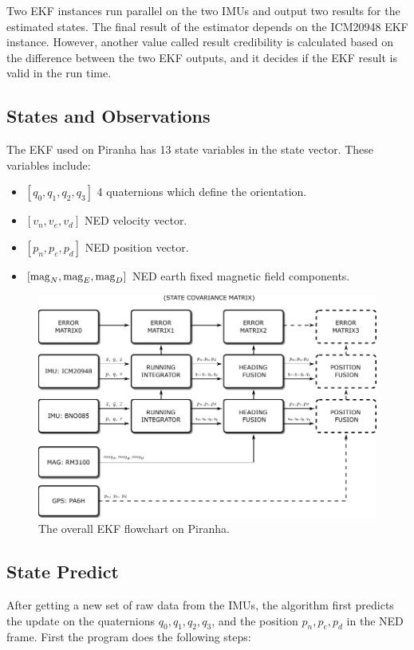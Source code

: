 Two EKF instances run parallel on the two IMUs and output two results for the estimated states. The final result of the estimator depends on the ICM20948 EKF instance. However, another value called result credibility is calculated based on the difference between the two EKF outputs, and it decides if the EKF result is valid in the run time.

\subsection{States and Observations}

The EKF used on Piranha has 13 state variables in the state vector. These variables include:

\begin{itemize}
    \item $[q_0,q_1,q_2,q_3]$ 4 quaternions which define the orientation.
    \item $[v_n,v_e,v_d]$ NED velocity vector.
    \item $[p_n,p_e,p_d]$ NED position vector.
    \item $[{\rm mag}_N, {\rm mag}_E, {\rm mag}_D]$ NED earth fixed magnetic field components.
\end{itemize}

\begin{figure}[ht]
    \centering
    \includegraphics[width=.8\textwidth]{images/05ekf-flowchart.pdf}
    \caption{The overall EKF flowchart on Piranha.}
    \label{fig:05ekf-flowchart}
\end{figure}

\subsection{State Predict}

After getting a new set of raw data from the IMUs, the algorithm first predicts the update on the quaternions $q_0,q_1,q_2,q_3$, and the position $p_n,p_e,p_d$ in the NED frame. First the program does the following steps:

